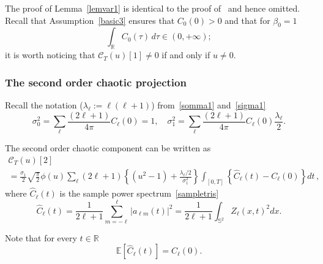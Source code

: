 \documentclass[AHL,Unicode,longabstracts,published]{cedram}
\newcommand{\clC}{\mathcal{C}}
\newcommand{\bbS}{\mathbb{S}}
\newcommand{\bbR}{\mathbb{R}}
\newcommand{\bbE}{\mathbb{E}}
\begin{document}
The proof of Lemma~\ref{lemvar1} is identical to the proof of~\cite[Lem\-ma~4.2]{MRV:20} and hence omitted. Recall that Assumption~\ref{basic3} ensures that $C_0(0)>0$ and that for $\beta_0=1$
\begin{equation*}
\int_{\bbR} C_0(\tau)\,d\tau \in (0,+\infty);
\end{equation*}
it is worth noticing that $\clC_T(u)[1]\ne 0$ if and only if $u\ne 0$.

\subsubsection{The second order chaotic projection}

Recall the notation ($\lambda _{\ell }:=\ell(\ell +1)$) from~\eqref{somma1} and~\eqref{sigma1}
\begin{equation*}
\sigma_{0}^{2} =\sum_{\ell}\frac{(2\ell +1)}{4\pi}C_{\ell}(0)=1,\quad
\sigma_{1}^{2} =\sum_{\ell}\frac{(2\ell +1)}{4\pi}C_{\ell}(0)\frac{\lambda _{\ell}}{2}.
\end{equation*}

\begin{prop}\label{propcaos2}
The second order chaotic component can be written as
\begin{multline}\label{2chaos}
\clC_T(u)[2]\\
=\frac{\sigma _{1}}{2}\sqrt{\frac{\pi }{2}}\phi (u)\sum_{\ell }(2\ell +1)\left\{ \left(u^{2}-1\right)+\frac{\lambda_{\ell }/2}{\sigma _{1}^{2}}
\right\} \int_{[0,T]} \left\{\widehat{C}_{\ell }(t)-C_{\ell }(0)\right\} dt \,,
\end{multline}
where $\widehat{C}_{\ell }(t)$ is the sample power spectrum~\eqref{sampletris}
\begin{equation*}
\widehat{C}_{\ell }(t)=\frac{1}{2\ell +1}\sum_{m=-\ell}^{\ell }\left\vert a_{\ell m}(t)\right\vert^{2}=\frac{1}{2\ell +1}\int_{\bbS^{2}}Z_{\ell}(x,t)^{2}dx\text{.}
\end{equation*}
\end{prop}

Note that for every $t\in \bbR$
\begin{equation*}
\bbE\left[\widehat C_\ell(t)\right] = C_\ell(0).
\end{equation*}
\end{document}
